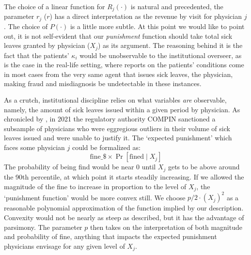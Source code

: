 \documentclass[../main.tex]{subfiles}
\begin{document}
The choice of a linear function for $R_j(\cdot)$ is natural and precedented, the parameter $r_j$ ($r$) has a direct interpretation as the revenue by visit for physician $j$. The choice of $P(\cdot)$ is a little more subtle. At this point we would like to point out, it is not self-evident that our \textit{punishment} function should take total sick leaves granted by physician ($X_j$) as its argument. The reasoning behind it is the fact that the patients' $\kappa_i$ would be unobservable to the institutional overseer, as is the case in the real-life setting, where reports on the patients' conditions come in most cases from the very same agent that issues sick leaves, the physician, making fraud and misdiagnosis be undetectable in these instances.

As a crutch, institutional discipline relies on what variables \textit{are} observable, namely, the amount of sick leaves issued within a given period by physician. As chronicled by \cite{oteiza}, in 2021 the regulatory authority COMPIN sanctioned a subsample of physicians who were eggregious outliers in their volume of sick leaves issued and were unable to justify it. The `expected punishment' which faces some physician $j$ could be formalized as:
\[
\text{fine\_\$} \times \operatorname{Pr}[\text{fined} \mid X_j]
\]
The probability of being find would be near 0 until $X_j$ gets to be above around the 90th percentile, at which point it starts steadily increasing. If we allowed the magnitude of the fine to increase in proportion to the level of $X_j$, the `punishment function' would be more convex still. We choose $p / 2 \cdot (X_j)^2$ as a reasonable polynomial approximation of the function implied by our description. Convexity would not be nearly as steep as described, but it has the advantage of parsimony. The parameter $p$ then takes on the interpretation of both magnitude and probability of fine, anything that impacts the expected punishment physicians envisage for any given level of $X_j$.
\end{document}
